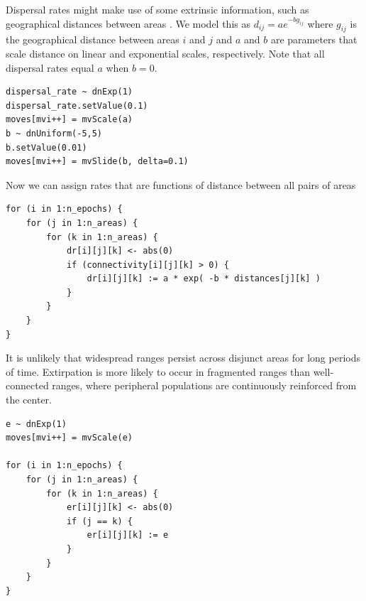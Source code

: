 Dispersal rates might make use of some extrinsic information, such as geographical distances between areas \citep{macarthur67, webb12}.
We model this as $d_{ij} = a e ^ {-b g_{ij}}$ where $g_{ij}$ is the geographical distance between areas $i$ and $j$ and $a$ and $b$ are parameters that scale distance on linear and exponential scales, respectively. Note that all dispersal rates equal $a$ when $b=0$.

\begin{snugshade}
\begin{lstlisting}
dispersal_rate ~ dnExp(1)
dispersal_rate.setValue(0.1)
moves[mvi++] = mvScale(a)
b ~ dnUniform(-5,5)
b.setValue(0.01)
moves[mvi++] = mvSlide(b, delta=0.1)
\end{lstlisting}
\end{snugshade}

Now we can assign rates that are functions of distance between all pairs of areas

\begin{snugshade}
\begin{lstlisting}
for (i in 1:n_epochs) {
    for (j in 1:n_areas) {
        for (k in 1:n_areas) {
            dr[i][j][k] <- abs(0)
            if (connectivity[i][j][k] > 0) {
                dr[i][j][k] := a * exp( -b * distances[j][k] )
            }
        }
    }
}
\end{lstlisting}
\end{snugshade}



It is unlikely that widespread ranges persist across disjunct areas for long periods of time.
Extirpation is more likely to occur in fragmented ranges than well-connected ranges, where peripheral populations are continuously reinforced from the center.

\begin{snugshade}
\begin{lstlisting}
e ~ dnExp(1)
moves[mvi++] = mvScale(e)

for (i in 1:n_epochs) {
    for (j in 1:n_areas) {
        for (k in 1:n_areas) {
            er[i][j][k] <- abs(0)
            if (j == k) {
                er[i][j][k] := e
            }
        }
    }
}

\end{lstlisting}
\end{snugshade}




